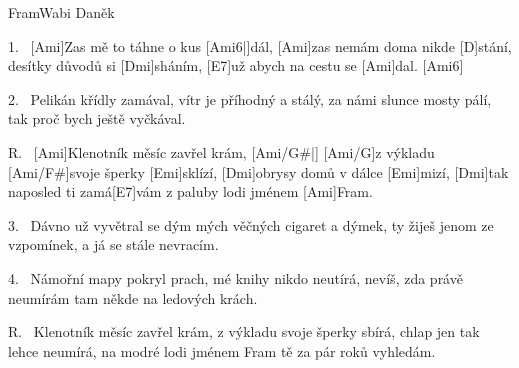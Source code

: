 \begin{song}{Fram}{Wabi Daněk}

\begin{xverse}{1.~}
[Ami]Zas mě to táhne o kus [Ami6|]{dál,} [Ami]{zas} nemám doma nikde [D]stání,
desítky důvodů si [Dmi]sháním, [E7]už abych na cestu se [Ami]dal. [Ami6]{}
\end{xverse}

\begin{xverse}{2.~}
Pelikán křídly zamával, vítr je příhodný a stálý,
za námi slunce mosty pálí, tak proč bych ještě vyčkával.
\end{xverse}

\begin{xverse}{R.~}
[Ami]Klenotník měsíc zavřel krám, [Ami/G#|]{}
[Ami/G]{z vý}kladu [Ami/F#]svoje šperky [Emi]sklízí,
[Dmi]obrysy domů v dálce [Emi]mizí,
[Dmi]tak naposled ti zamá[E7]vám
z paluby lodi jménem [Ami]Fram.
\end{xverse}

\begin{xverse}{3.~}
Dávno už vyvětral se dým mých věčných cigaret a dýmek,
ty žiješ jenom ze vzpomínek, a já se stále nevracím.
\end{xverse}

\begin{xverse}{4.~}
Námořní mapy pokryl prach, mé knihy nikdo neutírá,
nevíš, zda právě neumírám tam někde na ledových krách.
\end{xverse}

\begin{xverse}{R.~}
Klenotník měsíc zavřel krám, z výkladu svoje šperky sbírá,
chlap jen tak lehce neumírá, na modré lodi jménem Fram
tě za pár roků vyhledám.
\end{xverse}

\end{song}
\chords{ \chordAmiSix \chordAmiGis \chordAmiG \chordAmiFis }

